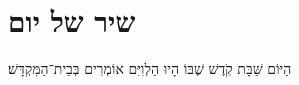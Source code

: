 \label{shacharitShabbatYTtitkabel}
\fullkaddish
\section[שיר של יום]{ שיר של יום‎ }

\begin{small}הַיּוֹם שַּׁבָּת קֹֽדֶשׁ שֶׁבּוֹ הָיוּ הַלְוִיִּם אוֹמְרִים בְּבֵית־הַמִּקְדָּשׁ׃\end{small}\\
\mizmorshabbat\\

\mournerskaddish